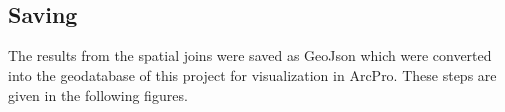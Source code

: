 \documentclass[article,12pt]{article}
\numberwithin{equation}{section}
\begin{document}
\begin{adjustwidth}{-.7in}{-.7in}
{\begin{minipage}{1\linewidth}
\begin{center}
\begin{minipage}{.7\linewidth}
				\end{minipage}
			\end{center}
		\end{minipage}
	}\\
	\\
\end{adjustwidth}

\subsection*{Saving}

The results from the spatial joins were saved as GeoJson which were converted into the geodatabase of this project for visualization in ArcPro. These steps are given in the following figures.
\end{document}
